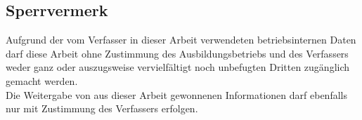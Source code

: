 \begin{centering}
\section*{Sperrvermerk}
\end{centering}
Aufgrund der vom Verfasser in dieser Arbeit verwendeten betriebsinternen Daten
darf diese Arbeit ohne Zustimmung des Ausbildungsbetriebs und des Verfassers
weder ganz oder auszugsweise vervielfältigt noch unbefugten Dritten zugänglich
gemacht werden.\\
Die Weitergabe von aus dieser Arbeit gewonnenen Informationen darf ebenfalls
nur mit Zustimmung des Verfassers erfolgen.
\clearpage